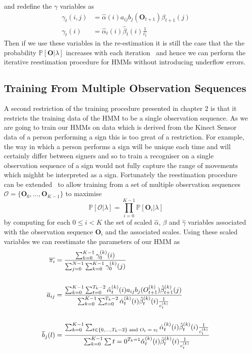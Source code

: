 and redefine the $\gamma$ variables as
\begin{align*}
\gamma_t(i,j)&=\hat{\alpha}(i)a_{ij}b_j(\mathbf{O}_{t+1})\beta_{t+1}(j)\\
\gamma_t(i) &= \hat{\alpha}_t(i)\hat{\beta}_t(i)\frac{1}{c_t}
\end{align*}
Then if we use these variables in the re-estimation it is still the case that the the probability $\mathbb{P}[\mathbf{O}|\lambda]$ increases with each iteration~\citep{rabiner1989tutorial} and hence we can perform the iterative reestimation procedure for HMMs without introducing underflow errors.

\subsection{Training From Multiple Observation Sequences}
A second restriction of the training procedure presented in chapter 2 is that it restricts the training data of the HMM to be a single observation sequence. As we are going to train our HMMs on data which is derived from the Kinect Sensor data of a person performing a sign this is too great of a restriction. For example, the way in which a person performs a sign will be unique each time and will certainly differ between signers and so to train a recogniser on a single observation sequence of a sign would not fully capture the range of movements which mighht be interpreted as a sign. Fortunately the reestimation procedure can be extended~\citep{li2000training, van2010can, rabiner1989tutorial} to allow training from a set of multiple observation sequences $\mathcal{O} =\{\mathbf{O}_0, \dots, \mathbf{O}_{K-1}\}$ to maximise 
\begin{equation*}
\mathbb{P}[\mathcal{O}|\lambda] = \prod_{i=0}^{K-1}\mathbb{P}[\mathbf{O}_i|\lambda]
\end{equation*}
by computing for each $0 \leq i < K$ the set of scaled $\hat{\alpha}$, $\hat{\beta}$ and $\hat{\gamma}$ variables associated with the observation sequence $\mathbf{O}_i$ and the associated scales. Using these scaled variables we can reestimate the parameters of our HMM as
\begin{align*}
\overline{\pi_i} &= \frac{\sum_{k=0}^{K-1}\gamma^{(k)}_0(i)}{\sum_{j=0}^{N-1}\sum_{k=0}^{K-1}\gamma^{(k)}_0(j)}\\
\vspace{30mm}\\
\overline{a}_{ij} &= \frac{\sum_{k=0}^{K-1}\sum_{t=0}^{T_k-2}\hat{\alpha}^{(k)}_t(i) a_{ij} b_j(O^{(k)}_{t+1}) \hat{\beta}^{(k)}_{t+1}(j)}{\sum_{k=0}^{K-1}\sum_{t=0}^{T_k-2}\hat{\alpha}^{(k)}_t(i)\hat{\beta}^{(k)}_t(i)\frac{1}{c^{(k)}_t}}\\
\vspace{30mm}\\
\overline{b}_j(l) &= \frac{\sum_{k=0}^{K-1}\sum_{t \in \{0,\dots,T_k-2\}\text{ and $O_t = v_l$}}\hat{\alpha}^{(k)}_t(i)\hat{\beta}^{(k)}_t(i)\frac{1}{c^{(k)}_t}}{\sum_{k=0}^{K-1}\sum{t=0}^{T_k=1}\hat{\alpha}^{(k)}_t(i)\hat{\beta}^{(k)}_t(i)\frac{1}{c^{(k)}_t}} \\
\end{align*}
